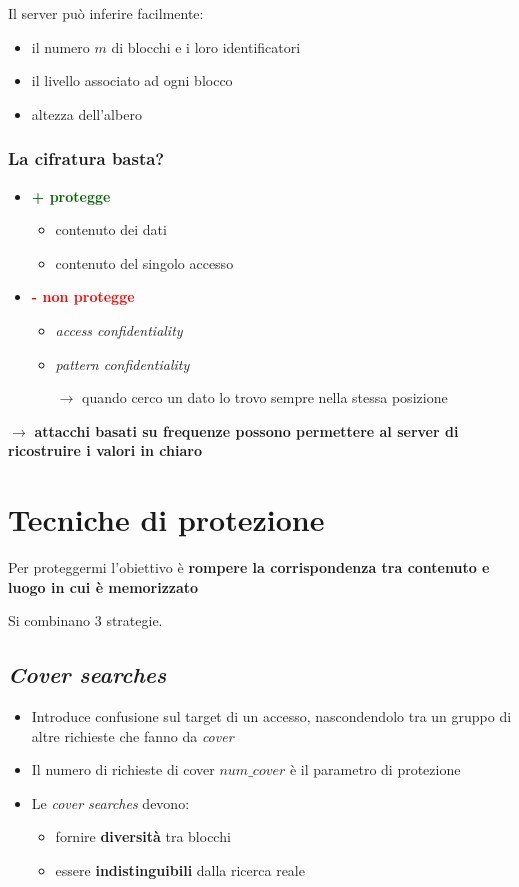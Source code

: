 \documentclass{report}
\begin{document}
\noindent Il server può inferire facilmente:
\begin{itemize}
    \item il numero $m$ di blocchi e i loro identificatori 
    \item il livello associato ad ogni blocco 
    \item altezza dell'albero
\end{itemize}

\newpage
\subsubsection{La cifratura basta?}
\begin{itemize}
    \item \textcolor{darkgreen}{\textbf{+ protegge}}  
    \begin{itemize}
        \item contenuto dei dati 
        \item contenuto del singolo accesso 
    \end{itemize}
    \item \textcolor{red}{\textbf{- non protegge}}
    \begin{itemize}
        \item \textit{access confidentiality}
        \item \textit{pattern confidentiality}
        
        $\rightarrow$ quando cerco un dato lo trovo sempre nella stessa posizione
    \end{itemize}
\end{itemize}

$\rightarrow$ \textbf{attacchi basati su frequenze possono permettere al server 
di ricostruire i valori in chiaro}

\section{Tecniche di protezione}
Per proteggermi l'obiettivo è \textbf{rompere la corrispondenza tra contenuto e luogo 
in cui è memorizzato }

\noindent Si combinano 3 strategie.

\subsection{\textit{Cover searches}}
\begin{itemize}
    \item Introduce confusione sul target di un accesso, nascondendolo tra un gruppo 
    di altre richieste che fanno da \textit{cover}
    \item Il numero di richieste di cover $num\_cover$ è il parametro di protezione
    \item Le \textit{cover searches} devono:
    \begin{itemize}
        \item fornire \textbf{diversità} tra blocchi 
        \item essere \textbf{indistinguibili} dalla ricerca reale
    \end{itemize}
\end{itemize}
\end{document}
